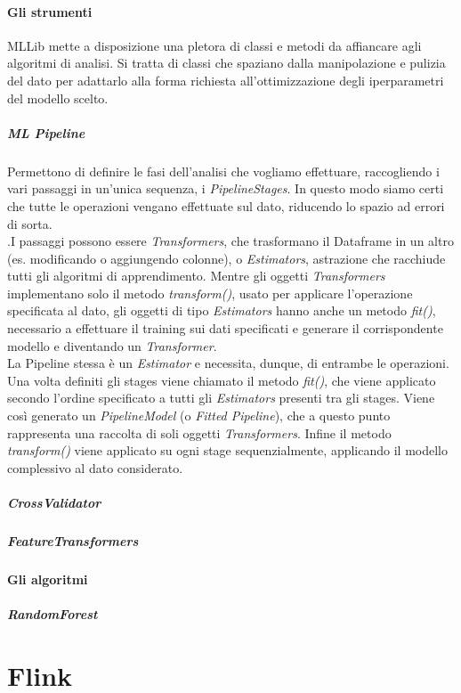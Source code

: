 \paragraph{Gli strumenti} MLLib mette a disposizione una pletora di classi e metodi da affiancare agli algoritmi di analisi. Si tratta di classi che spaziano dalla manipolazione e pulizia del dato per adattarlo alla forma richiesta all'ottimizzazione degli iperparametri del modello scelto.
\subparagraph{ML Pipeline}
Permettono di definire le fasi dell'analisi che vogliamo effettuare, raccogliendo i vari passaggi in un'unica sequenza, i \textit{PipelineStages}. In questo modo siamo certi che tutte le operazioni vengano effettuate sul dato, riducendo lo spazio ad errori di sorta.\\
.I passaggi possono essere \textit{Transformers}, che trasformano il Dataframe in un altro (es. modificando o aggiungendo colonne), o \textit{Estimators}, astrazione che racchiude tutti gli algoritmi di apprendimento. Mentre gli oggetti \textit{Transformers} implementano solo il metodo \textit{transform()}, usato per applicare l'operazione specificata al dato, gli oggetti di tipo \textit{Estimators} hanno anche un metodo \textit{fit()}, necessario a effettuare il training sui dati specificati e generare il corrispondente modello e diventando un \textit{Transformer}.\\ 
La Pipeline stessa è un \textit{Estimator} e necessita, dunque, di entrambe le operazioni. Una volta definiti gli stages viene chiamato il metodo \textit{fit()}, che viene applicato secondo l'ordine specificato a tutti gli \textit{Estimators} presenti tra gli stages. Viene così generato un \textit{PipelineModel} (o \textit{Fitted Pipeline}), che a questo punto rappresenta una raccolta di soli oggetti \textit{Transformers}. Infine il metodo \textit{transform()} viene applicato su ogni stage sequenzialmente, applicando il modello complessivo al dato considerato.
\subparagraph{CrossValidator}
\subparagraph{FeatureTransformers}

\paragraph{Gli algoritmi}

\subparagraph{RandomForest}

\pagebreak
\section{Flink}\label{Flink}

